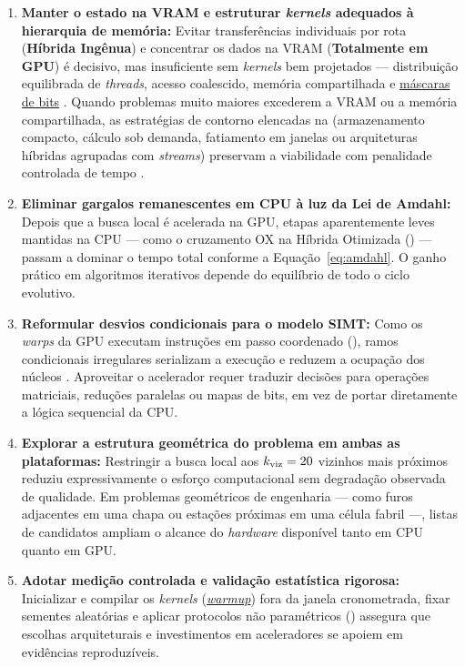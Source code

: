 \begin{enumerate}
      \item
            \textbf{Manter o estado na VRAM e estruturar \emph{kernels} adequados à hierarquia de memória:} Evitar transferências individuais por rota (\textbf{Híbrida Ingênua}) e concentrar os dados na VRAM (\textbf{Totalmente em GPU}) é decisivo, mas insuficiente sem \emph{kernels} bem projetados --- distribuição equilibrada de \emph{threads}, acesso coalescido, memória compartilhada e \hyperlink{term:bitmap}{máscaras de bits} \autocite{kirk2010programming,nvidia2024cuda}. Quando problemas muito maiores excederem a VRAM ou a memória compartilhada, as estratégias de contorno elencadas na  (armazenamento compacto, cálculo sob demanda, fatiamento em janelas ou arquiteturas híbridas agrupadas com \emph{streams}) preservam a viabilidade com penalidade controlada de tempo \autocite{schulz2013gpu,oneil2015rethinking,tsp_gpu}.
      \item
            \textbf{Eliminar gargalos remanescentes em CPU à luz da Lei de Amdahl:} Depois que a busca local é acelerada na GPU, etapas aparentemente leves mantidas na CPU --- como o cruzamento OX na Híbrida Otimizada () --- passam a dominar o tempo total conforme a Equação~\eqref{eq:amdahl}. O ganho prático em algoritmos iterativos depende do equilíbrio de todo o ciclo evolutivo.
      \item
            \textbf{Reformular desvios condicionais para o modelo SIMT:} Como os \emph{warps} da GPU executam instruções em passo coordenado (), ramos condicionais irregulares serializam a execução e reduzem a ocupação dos núcleos \autocite{kirk2010programming,nvidia2024cuda}. Aproveitar o acelerador requer traduzir decisões para operações matriciais, reduções paralelas ou mapas de bits, em vez de portar diretamente a lógica sequencial da CPU.
      \item
            \textbf{Explorar a estrutura geométrica do problema em ambas as plataformas:} Restringir a busca local aos \(k_{\text{viz}} = 20\) vizinhos mais próximos reduziu expressivamente o esforço computacional sem degradação observada de qualidade. Em problemas geométricos de engenharia --- como furos adjacentes em uma chapa ou estações próximas em uma célula fabril ---, listas de candidatos ampliam o alcance do \emph{hardware} disponível tanto em CPU quanto em GPU.
      \item
            \textbf{Adotar medição controlada e validação estatística rigorosa:} Inicializar e compilar os \emph{kernels} (\hyperlink{term:warmup}{\emph{warmup}}) fora da janela cronometrada, fixar sementes aleatórias e aplicar protocolos não paramétricos () assegura que escolhas arquiteturais e investimentos em aceleradores se apoiem em evidências reproduzíveis.
\end{enumerate}

